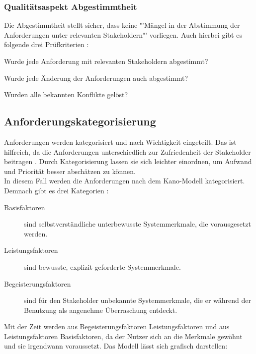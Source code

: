 \documentclass [12pt, a4paper, oneside, titlepage, ngerman]{article}
\begin{document}
\subsubsection{Qualitätsaspekt Abgestimmtheit}
Die Abgestimmtheit stellt sicher, dass keine "'Mängel in der Abstimmung der Anforderungen unter relevanten Stakeholdern"'\cite[S.100]{PohlRupp2015} vorliegen. Auch hierbei gibt es folgende drei Prüfkriterien\cite[vgl.][S.100]{PohlRupp2015} :
\begin{description}[font=\itshape]\setlength\itemsep{0em}
\item[Abstimmung:] Wurde jede Anforderung mit relevanten Stakeholdern abgestimmt?
\item[Abstimmung nach Änderungen:] Wurde jede Änderung der Anforderungen auch abgestimmt?
\item[Konflikte:] Wurden alle bekannten Konflikte gelöst?
\end{description}

\subsection{Anforderungskategorisierung}
Anforderungen werden kategorisiert und nach Wichtigkeit eingeteilt. Das ist hilfreich, da die Anforderungen unterschiedlich zur Zufriedenheit der Stakeholder beitragen \cite[vgl. S.24]{PohlRupp2015}. Durch Kategorisierung lassen sie sich leichter einordnen, um Aufwand und Priorität besser abschätzen zu können. \\
In diesem Fall werden die Anforderungen nach dem Kano-Modell kategorisiert. Demnach gibt es drei Kategorien \cite[vgl. S.24]{PohlRupp2015}:
\begin{description} 
\item[Basisfaktoren] sind selbstverständliche unterbewusste Systemmerkmale, die vorausgesetzt werden. 
\item[Leistungsfaktoren] sind bewusste, explizit geforderte Systemmerkmale.
\item[Begeisterungsfaktoren] sind für den Stakeholder unbekannte Systemmerkmale, die er während der Benutzung als angenehme Überraschung entdeckt.
\end{description}
Mit der Zeit werden aus Begeisterungsfaktoren Leistungsfaktoren und aus Leistungsfaktoren Basisfaktoren, da der Nutzer sich an die Merkmale gewöhnt und sie irgendwann voraussetzt. Das Modell lässt sich grafisch darstellen: 
\end{document}
